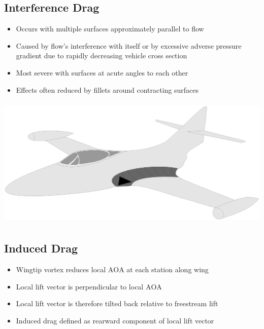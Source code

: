 \documentclass[
]{book}
\providecommand{\tightlist}{%
  \setlength{\itemsep}{0pt}\setlength{\parskip}{0pt}}
\begin{document}
\hypertarget{interference-drag}{%
\subsection{Interference Drag}\label{interference-drag}}

\begin{itemize}
\tightlist
\item
  Occurs with multiple surfaces approximately parallel to flow
\item
  Caused by flow's interference with itself or by excessive adverse pressure gradient due to rapidly decreasing vehicle cross section
\item
  Most severe with surfaces at acute angles to each other
\item
  Effects often reduced by fillets around contracting surfaces
\end{itemize}

\includegraphics[width=5.563in,height=2.5in]{media/05/image50.svg}

\hypertarget{induced-drag}{%
\subsection{Induced Drag}\label{induced-drag}}

\begin{itemize}
\tightlist
\item
  Wingtip vortex reduces local \(\mathrm{AOA}\) at each station along wing
\item
  Local lift vector is perpendicular to local \(\mathrm{AOA}\)
\item
  Local lift vector is therefore tilted back relative to freestream lift
\item
  Induced drag defined as rearward component of local lift vector
\end{itemize}
\end{document}
